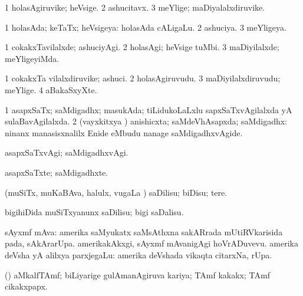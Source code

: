 \bentry
{} 
\gl{\nA}
\expl{}
\bmng
\bnum
\num{1} holasAgiruvike; heVsige. 
\num{2} ashucitavx. 
\num{3} meYlige; maDiyalalxdiruvike. 
\enum
\emng
\eentry

\bentry
{} 
\gl{\gu}
\expl{}
\bmng
\bnum
\num{1} holasAda; keTaTx; heVsigeya:  holasAda cALigaLu. 
\num{2} ashuciya. 
\num{3} meYligeya. 
\enum
\emng
\eentry

\bentry
{} 
\gl{\kirxvi}
\expl{}
\bmng
\bnum
\num{1} cokakxTavilalxde; ashuciyAgi. 
\num{2} holasAgi; heVsige tuMbi. 
\num{3} maDiyilalxde; meYligeyiMda. 
\enum
\emng
\eentry

\bentry
{} 
\gl{\nA}
\expl{}
\bmng
\bnum
\num{1} cokakxTa vilalxdiruvike; ashuci. 
\num{2} holasAgiruvudu. 
\num{3} maDiyilalxdiruvudu; meYlige. 
\num{4} aBakaSxyXte. 
\enum
\emng
\eentry

\bentry
{} 
\gl{\gu}
\expl{}
\bmng
\bnum
\num{1} asapxSaTx; saMdigadhx; masukAda; tiLidukoLaLxlu sapxSaTxvAgilalxda yA sulaBavAgilalxda. 
\num{2} (vayxkitxya \vi) anishicxta; saMdeVhAsapxda; saMdigadhx:  ninanx manasisxnalilx Enide eMbudu nanage saMdigadhxvAgide. 
\enum
\emng
\eentry

\bentry
{} 
\gl{\kirxvi}
\expl{}
\bmng
asapxSaTxvAgi; saMdigadhxvAgi. 
\emng
\eentry

\bentry
{} 
\gl{\nA}
\expl{}
\bmng
asapxSaTxte; saMdigadhxte. 
\emng
\eentry

\bentry
{} 
\gl{\sakirx}
\expl{}
\bmng
(muSiTx, muKaBAva, halulx, \mo vugaLa \vi) saDilisu; biDisu; tere. 
\emng

\noindent 
\gl{\akirx}
\expl{}
\bmng
bigihiDida muSiTxyanunx saDilisu; bigi saDalisu. 
\emng
\eentry

\bentry
{}
\gl{\nA}
\expl{}
\bmng
sAyxmf mAva: 
\banum
{} amerika saMyukatx saMsAthxna sakARrada mUtiRVkarisida pada, sAkArarUpa.  amerikakAkxgi, sAyxmf mAvanigAgi hoVrADuvevu. 
 amerika deVsha yA alilxya parxjegaLu:  amerika deVshada vikaqta citarxNa, rUpa. 
\eanum
\emng
\eentry

\bentry
{}
\gl{\nA}
\expl{}
\bmng
(\ame) aMkalfTAmf; biLiyarige gulAmanAgiruva kariya; TAmf kakakx; TAmf cikakxpapx. 
\emng
\eentry

